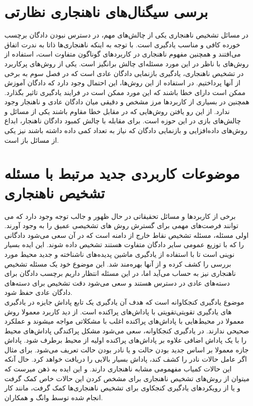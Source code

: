 \documentclass[12pt,a4paper]{report}
\theoremstyle{definition}
\theoremstyle{definition}
\begin{document}
	\section{برسی سیگنال‌‌های ناهنجاری نظارتی}
در مسائل تشخیص ناهنجاری یکی از چالش‌های مهم، در دسترس نبودن دادگان برچسب خورده کافی و مناسب یادگیری است. با توجه به اینکه ناهنجاری‌ها ذاتا به ندرت اتفاق می‌افتند و همچنین مفهوم ناهنجاری در کاربرد‌های گوناگون متفاوت است، استفاده از روش‌های با ناظر در این مورد مسئله‌ای چالش برانگیز است. یکی از روش‌های پرکاربرد در تشخیص ناهنجاری، یادگیری بازنمایی دادگان عادی است که در فصل سوم به برخی از آنها پرداختیم. در استفاده از این روش‌ها، این احتمال وجود دارد که دادگان آموزش ممکن است دارای خطا باشند که این مورد ممکن است در فرایند یادگیری تاثیر بگذارد. همچنین در بسیاری از کاربرد‌ها مرز مشخص و دقیقی میان دادگان عادی و ناهنجار وجود ندارد. از این رو یافتن روش‌هایی که در مقابل خطا مقاوم باشند یکی از مسائل و چالش‌های بازی در این حوزه است. برای مقابله با چالش کمبود دادگان ناهنجار، ابداع روش‌های داده‌افزایی و بازنمایی دادگان که نیاز به تعداد کمی داده داشته باشند نیز یکی از مسائل باز است. 

	\section{موضوعات کاربردی جدید مرتبط با مسئله تشخیص ناهنجاری}
برخی از کاربرد‌ها و مسائل تحقیقاتی در حال ظهور و جالب توجه وجود دارد که می توانند فرصت‌های مهمی برای گسترش روش های تشخیصی عمیق  را به وجود آورند. اولی مسئله، مسئله تشخیص نقاط خارج از دامنه است که در آن سعی می‌شود دادگانی را که با توزیع عمومی سایر دادگان متفاوت هستند تشخیص داده شوند\cite{https://doi.org/10.48550/arxiv.1610.02136, NEURIPS2018_abdeb6f5, https://doi.org/10.48550/arxiv.1906.02845}. این ایده بسیار نوینی است تا با استفاده از یادگیری ماشین پدیده‌های ناشناخته و جدید محیط مورد بررسی را کشف کرده و از آنها بهره‌مند شد. این موضوع خود یک مسئله تشخیص ناهنجاری نیز به حساب می‌آید اما، در این مسئله انتظار داریم برچسب دادگان برای دسته‌های عادی در دسترس هستند و سعی می‌شود دقت تشخیص برای دسته‌های دادگان عادی حفظ شود. \\

موضوع یادگیری کنجکاوانه است\cite{https://doi.org/10.48550/arxiv.1810.12894, https://doi.org/10.48550/arxiv.1808.04355, https://doi.org/10.48550/arxiv.1705.05363} که هدف آن یادگیری یک تابع پاداش جایزه در یادگیری تقویتی با پاداش‌های پراکنده است. از دید کاربرد معمولا روش‌‎های یادگیری تقویتی معمولا در محیط‌هایی با پاداش‌های پراکنده اغلب با مشکلاتی مواجه میشوند و عملکرد صحیحی ندارند. در یادگیری کنجکاوانه، سعی می‌شود مشکل پراکندگی پاداش‌های محیط را با یک پاداش اضافی علاوه بر پاداش‌های پراکنده اولیه از محیط برطرف شود. پاداش جازه معمولا بر اساس جدید بودن حالت و یا نادر بودن حالت تعریف می‌شود. برای مثال اگر عامل حالات نادر را کشف کند، پاداش بسیار بالایی را دریافت خواهد کرد. حال آنکه این حالات کمیاب مفهمومی مشابه ناهنجاری دارند. و این ایده به ذهن میرست که میتوان از روش‌های تشخیص ناهنجاری برای مشخص کردن این حالات خاص کمک گرفت و یا از رویکرد‌های یادگیری کنجکاوی برای تشخیص ناهنجاری‌ها کمک گرفت، مانند کار انجام شده توسط وانگ و همکاران\cite{ijcai2020p408}.\\
\end{document}

